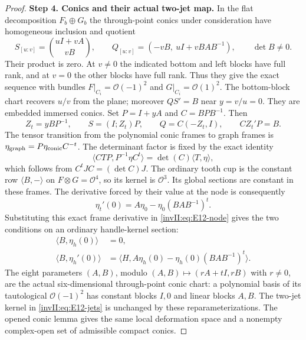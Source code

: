 \begin{proof}
\noindent\textbf{Step 4. Conics and their actual two-jet map.}
In the flat decomposition $F_b\oplus G_b$ the through-point conics
under consideration have homogeneous inclusion and quotient
\[
 S_{[u:v]}=\binom{uI+vA}{vB},\qquad
 Q_{[u:v]}=(-vB,\ uI+vBAB^{-1}),\qquad \det B\ne0.
\]
Their product is zero. At $v\ne0$ the indicated bottom and left
blocks have full rank, and at $v=0$ the other blocks have full rank.
Thus they give the exact sequence with bundles
$F|_{C_i}=\mathcal O(-1)^2$ and $G|_{C_i}=\mathcal O(1)^2$.
The bottom-block chart recovers $u/v$ from the plane; moreover
$QS'=B$ near $y=v/u=0$. They are embedded immersed conics.
Set $P=I+yA$ and $C=BPB^{-1}$. Then
\[
 Z_t=yBP^{-1},\qquad S=(I;Z_t)P,
 \qquad Q=C(-Z_t,I),\qquad C Z_t'P=B.
\]
The tensor transition from the polynomial conic frames to graph
frames is $\eta_{\rm graph}=P\eta_{\rm conic}C^{-t}$.
The determinant factor is fixed by the exact identity
\[
 \langle CTP,P^{-1}\eta C^t\rangle
       =\det(C)\langle T,\eta\rangle,
\]
which follows from $C^tJC=(\det C)J$.
The ordinary tooth cup is the constant row $\langle B,-\rangle$
on $F\otimes G=\mathcal O^4$, so its kernel is $\mathcal O^3$.
Its global sections are constant in these frames. The derivative
forced by their value at the node is consequently
\[
 \eta_t'(0)=A\eta_0-\eta_0(BAB^{-1})^t.
\]
Substituting this exact frame derivative in \eqref{invII:eq:E12-node}
gives the two conditions on an ordinary handle-kernel section:
\[
 \begin{split}
 \langle B,\eta_h(0)\rangle&=0,\\
 \langle B,\eta_h'(0)\rangle
  &=\langle H,A\eta_h(0)-\eta_h(0)(BAB^{-1})^t\rangle.
 \end{split}                                        \tag{E.12.2}\label{invII:eq:E12-jets}
\]
The eight parameters $(A,B)$, modulo
$(A,B)\mapsto(rA+tI,rB)$ with $r\ne0$, are the actual
six-dimensional through-point conic chart: a polynomial basis
of its tautological $\mathcal O(-1)^2$ has constant blocks $I,0$
and linear blocks $A,B$. The two-jet kernel in
\eqref{invII:eq:E12-jets} is unchanged by these reparameterizations.
The opened conic lemma gives the same local deformation space and
a nonempty complex-open set of admissible compact conics.


\end{proof}
